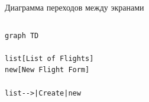 \documentclass[aspectratio=169,handout,bigger]{beamer}
\begin{document}

\begin{frame}[fragile]{Диаграмма переходов между экранами}
  \begin{columns}
    \begin{column}{.5\textwidth}
\begin{verbatim}
graph TD

list[List of Flights]
new[New Flight Form]

list-->|Create|new
\end{verbatim}
\end{column}
\begin{column}{.5\textwidth}
\end{column}
\end{columns}
\end{frame}

\end{document}
